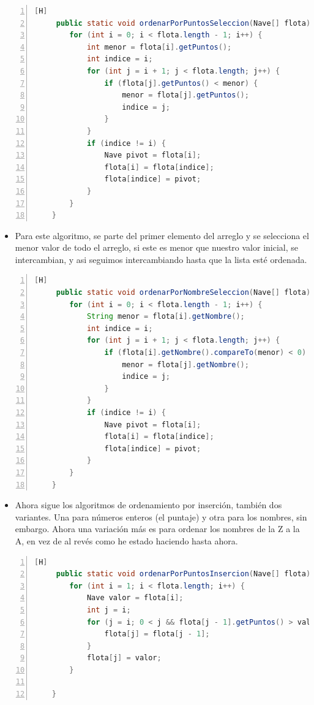 \documentclass{article}
\begin{document}
	\begin{lstlisting}[language=java,caption={Ordenamiento por selección: Enteros}, numbers=left][H]
	 public static void ordenarPorPuntosSeleccion(Nave[] flota) {
        for (int i = 0; i < flota.length - 1; i++) {
            int menor = flota[i].getPuntos();
            int indice = i;
            for (int j = i + 1; j < flota.length; j++) {
                if (flota[j].getPuntos() < menor) {
                    menor = flota[j].getPuntos();
                    indice = j;
                }
            }
            if (indice != i) {
                Nave pivot = flota[i];
                flota[i] = flota[indice];
                flota[indice] = pivot;
            }
        }
    }
	\end{lstlisting}
	\begin{itemize}	
		\item Para este algoritmo, se parte del primer elemento del arreglo y se selecciona el menor valor de todo el arreglo, si este es menor que nuestro valor inicial, se intercambian, y asi seguimos intercambiando hasta que la lista esté ordenada.
	\end{itemize}
	\begin{lstlisting}[language=java,caption={Ordenamiento por selección: Cadenas}, numbers=left][H]
	 public static void ordenarPorNombreSeleccion(Nave[] flota) {
        for (int i = 0; i < flota.length - 1; i++) {
            String menor = flota[i].getNombre();
            int indice = i;
            for (int j = i + 1; j < flota.length; j++) {
                if (flota[i].getNombre().compareTo(menor) < 0) {
                    menor = flota[j].getNombre();
                    indice = j;
                }
            }
            if (indice != i) {
                Nave pivot = flota[i];
                flota[i] = flota[indice];
                flota[indice] = pivot;
            }
        }
    }
	\end{lstlisting}
	\begin{itemize}	
		\item Ahora sigue los algoritmos de ordenamiento por inserción, también dos variantes. Una para números enteros (el puntaje) y otra para los nombres, sin embargo. Ahora una variación más es para ordenar los nombres de la Z a la A, en vez de al revés como he estado haciendo hasta ahora.
	\end{itemize}
	\begin{lstlisting}[language=java,caption={Ordenamiento por inserción: Enteros}, numbers=left][H]
	 public static void ordenarPorPuntosInsercion(Nave[] flota) {
        for (int i = 1; i < flota.length; i++) {
            Nave valor = flota[i];
            int j = i;
            for (j = i; 0 < j && flota[j - 1].getPuntos() > valor.getPuntos(); j--) {
                flota[j] = flota[j - 1];
            }
            flota[j] = valor;
        }

    }
	\end{lstlisting}
\end{document}
